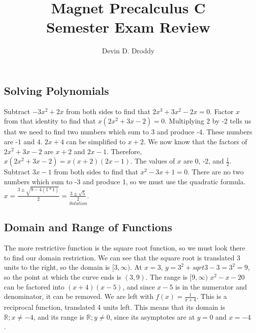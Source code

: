 \documentclass{report}
\title{\Huge{Magnet Precalculus C}\\Semester Exam Review}
\author{\huge{Devin D. Droddy}}
\date{}
\begin{document}
\maketitle
\newpage%
\tableofcontents
\pagebreak

\chapter{}
\section{Solving Polynomials}
\sol Subtract \(-3x^2+2x\) from both sides to find that \(2x^3+3x^2-2x=0\). Factor \(x\) from that identity to find that \(x(2x^2+3x-2)=0\). Multiplying 2 by -2 tells us that we need to find two numbers which sum to 3 and produce -4. These numbers are -1 and 4. \(2x+4\) can be simplified to \(x+2\). We now know that the factors of \(2x^2+3x-2\) are \(x+2\) and \(2x-1\). Therefore, \(x(2x^2+3x-2)=x(x+2)(2x-1)\). The values of \(x\) are 0, -2, and \(\frac{1}{2}\).
\sol Subtract \(3x-1\) from both sides to find that \(x^2-3x+1=0\). There are no two numbers which sum to -3 and produce 1, so we must use the quadratic formula. \(x=\frac{3\pm\sqrt{9-4(1*1)}}{2}=\underset{Solution}{\boxed{\frac{3\pm\sqrt{5}}{2}}}\).
\section{Domain and Range of Functions}
\sol The more restrictive function is the square root function, so we must look there to find our domain restriction. We can see that the square root is translated 3 units to the right, so the domain is \([3,\infty)\). At \(x=3\), \(y=3^2+sqrt{3-3}=3^2=9\), so the point at which the curve ends is \((3, 9)\). The range is \([9,\infty)\)
\sol \(x^2-x-20\) can be factored into \((x+4)(x-5)\), and since \(x-5\) is in the numerator and denominator, it can be removed. We are left with \(f(x)=\frac{1}{x+4}\). This is a reciprocal function, translated 4 units left. This means that its domain is \(\mathbb{R};x\neq -4\), and its range is \(\mathbb{R};y\neq 0\), since its asymptotes are at \(y=0\) and \(x=-4\).
\end{document}
